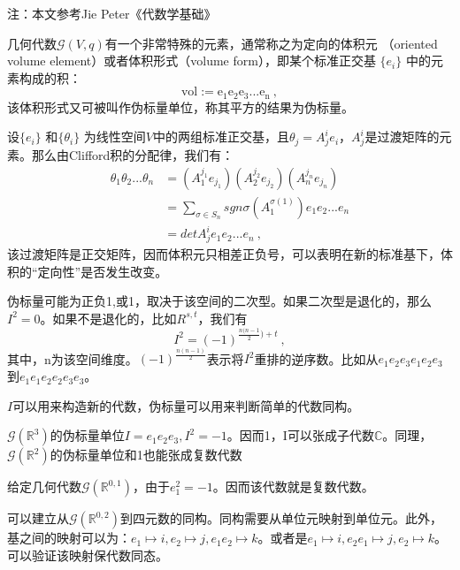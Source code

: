 注：本文参考Jie Peter《代数学基础》

几何代数$\mathcal G(V,q)$有一个非常特殊的元素，通常称之为定向的体积元
（oriented volume element）或者体积形式（volume form），即某个标准正交基 $\{e_i\}$ 中的元素构成的积：
$$\mathrm {vol:=e_1e_2e_3...e_n}~,$$
该体积形式又可被叫作伪标量单位，称其平方的结果为伪标量。

设$\{e_i\}$ 和$\{\theta_i\}$ 为线性空间$V$中的两组标准正交基，且$\theta_j=A^i_j e_i$，$A^i_j$是过渡矩阵的元素。那么由Clifford积的分配律，我们有：
\begin{equation}
\begin{aligned}
\theta_1\theta_2...\theta_n&=(A^{j_1}_1 e_{j_1})(A^{j_2}_2 e_{j_2})(A^{j_n}_n e_{j_n})\\
&=\sum_{\sigma\in S_n} sgn\sigma(A^{\sigma (1)}_1)e_1e_2...e_n\\
&=det A^i_je_1e_2...e_n~,
\end{aligned}
\end{equation}
该过渡矩阵是正交矩阵，因而体积元只相差正负号，可以表明在新的标准基下，体积的“定向性”是否发生改变。

伪标量可能为正负1,或1，取决于该空间的二次型。如果二次型是退化的，那么$I^2=0$。如果不是退化的，比如$R^{s,t}$，我们有
\begin{equation}
I^2=(-1)^{\frac{n(n-1}{2})+t}~,
\end{equation}
其中，n为该空间维度。$(-1)^{\frac{n(n-1)}{2}}$表示将$I^2$重排的逆序数。比如从$e_1e_2e_3e_1e_2e_3$到$e_1e_1e_2e_2e_3e_3$。

$I$可以用来构造新的代数，伪标量可以用来判断简单的代数同构。

\begin{example}{}
$\mathcal G(\mathbb R^3)$的伪标量单位$I=e_1e_2e_3,I^2=-1$。因而{1，I}可以张成子代数$\mathbb C$。同理，$\mathcal G(\mathbb R^2)$的伪标量单位和1也能张成复数代数
\end{example}
\begin{example}{}
给定几何代数$\mathcal G(\mathbb R^{0,1})$，由于$e_1^2=-1$。因而该代数就是复数代数。
\end{example}
\begin{example}{}
可以建立从$\mathcal G(\mathbb R^{0,2})$到四元数的同构。同构需要从单位元映射到单位元。此外，基之间的映射可以为：$e_1\mapsto i,e_2\mapsto j,e_1e_2\mapsto k$。或者是$e_1\mapsto i,e_2 e_1\mapsto j,e_2\mapsto k$。可以验证该映射保代数同态。
\end{example}
